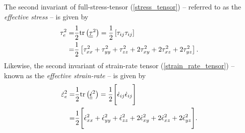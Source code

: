 The second invariant of full-stress-tensor (\ref{stress_tensor}) -- referred to as the  \emph{effective stress} -- is given by
\begin{align}
  \tau_e^2 = & \frac{1}{2} \mathrm{tr}\left( \underline{\underline{\tau}}^2 \right) = \frac{1}{2} \left[ \tau_{ij} \tau_{ij} \right] \notag \\
  \label{effectivstress}
  = &\frac{1}{2} \left[ \tau_{xx}^2 + \tau_{yy}^2 + \tau_{zz}^2 + 2\tau_{xy}^2 + 2\tau_{xz}^2 + 2\tau_{yz}^2 \right].
\end{align}
Likewise, the second invariant of strain-rate tensor (\ref{strain_rate_tensor}) -- known as the  \emph{effective strain-rate} -- is given by
\begin{align}
  \dot{\varepsilon}_e^2 = & \frac{1}{2} \mathrm{tr}\left( \underline{\underline{\dot{\epsilon}}}^2 \right) = \frac{1}{2} \Bigg[ \dot{\epsilon}_{ij} \dot{\epsilon}_{ij} \Bigg] \notag \\
  \label{effective_strain_rate}
  = &\frac{1}{2} \Bigg[ \dot{\epsilon}_{xx}^2 + \dot{\epsilon}_{yy}^2 + \dot{\epsilon}_{zz}^2 + 2\dot{\epsilon}_{xy}^2 + 2\dot{\epsilon}_{xz}^2 + 2\dot{\epsilon}_{yz}^2 \Bigg].
\end{align}

